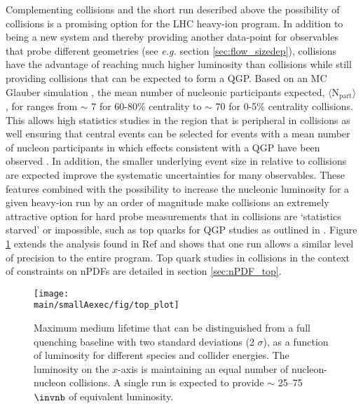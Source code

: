 \documentclass[../report.tex]{subfiles}
\providecommand{\main}{..}
\begin{document}
Complementing \PbPb collisions and the short \OO run described above the possibility of \ArAr collisions is a promising option for the LHC heavy-ion program.  In addition to being a new system and thereby providing another data-point for observables that probe different geometries (see \textit{e.g.} section \ref{sec:flow_sizedep}), \ArAr collisions have the advantage of reaching much higher luminosity than \PbPb collisions while still providing collisions that can be expected to form a QGP.  Based on an MC Glauber simulation \cite{Miller:2007ri}, the mean number of nucleonic participants expected, $\langle \mathrm{N_{part}}\rangle$, for \ArAr ranges from  $\sim$ 7 for 60-80\% centrality to $\sim$ 70 for 0-5\% centrality collisions.  This allows high statistics studies in the region that is peripheral in \PbPb collisions as well ensuring that central events can be selected for events with a mean number of nucleon participants in which effects consistent with a QGP have been observed \cite{Sirunyan:2018eqi, ATLAS-CONF-2018-007}.  In addition, the smaller underlying event size in \ArAr relative to \PbPb collisions are expected improve the systematic uncertainties for many observables.  These features combined with the possibility to increase the nucleonic luminosity for a given heavy-ion run by an order of magnitude make \ArAr collisions an extremely attractive option for hard probe measurements that in \PbPb collisions are `statistics starved' or impossible, such as top quarks for QGP studies as outlined in \cite{Apolinario:2017sob}.  Figure \ref{fig:boosted_tops} extends the analysis found in Ref \cite{Apolinario:2017sob} and shows that one \ArAr run allows a similar level of precision to the entire \PbPb program.  Top quark studies in \ArAr collisions in the context of constraints on nPDFs are detailed in section \ref{sec:nPDF_top}.
\begin{figure}
\centering
\texttt{[image: \\main/smallAexec/fig/top\_plot]}
\caption{Maximum medium lifetime that can be distinguished from a full quenching baseline with two standard deviations (2 $\sigma$), as a function of luminosity for different species and collider energies. The luminosity on the $x$-axis is maintaining an equal number of nucleon-nucleon collisions. A single \ArAr run is expected to provide $\sim$ 25--75 $\invnb$ of \PbPb equivalent luminosity.}
\label{fig:boosted_tops}
\end{figure}
\end{document}
